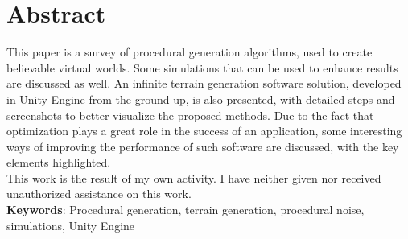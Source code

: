 \chapter*{Abstract}

\pagestyle{fancy}


\label{abstract}

This paper is a survey of procedural generation algorithms, used to create believable virtual worlds. Some simulations that can be used to enhance results are discussed as well. An infinite terrain generation software solution, developed in Unity Engine from the ground up, is also presented, with detailed steps and screenshots to better visualize the proposed methods. Due to the fact that optimization plays a great role in the success of an application, some interesting ways of improving the performance of such software are discussed, with the key elements highlighted.\\

This work is the result of my own activity. I have neither given nor received unauthorized assistance on this work.\\

\textbf{Keywords}: Procedural generation, terrain generation, procedural noise, simulations, Unity Engine